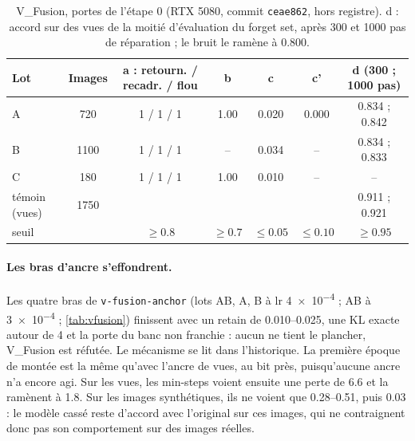 \documentclass[11pt,a4paper]{article}
\newcommand{\code}[1]{\texttt{#1}}
\begin{document}
\begin{table}[ht]
  \centering\small
  \caption{V\_Fusion, portes de l'étape 0 (RTX 5080, commit \code{ceae862}, hors registre). d :
  accord sur des vues de la moitié d'évaluation du forget set, après 300 et 1000 pas de réparation ; le
  bruit le ramène à \num{0.800}.}\label{tab:vfusionportes}
  \setlength{\tabcolsep}{4pt}
  \begin{tabular}{@{}lcccccc@{}}
    \toprule
    Lot & Images & a : retourn. / recadr. / flou & b & c & c' & d (300 ; 1000 pas)\\
    \midrule
    A & 720 & 1 / 1 / 1 & \num{1.00} & \num{0.020} & \num{0.000} & \num{0.834} ; \num{0.842}\\
    B & 1100 & 1 / 1 / 1 & -- & \num{0.034} & -- & \num{0.834} ; \num{0.833}\\
    C & 180 & 1 / 1 / 1 & \num{1.00} & \num{0.010} & -- & --\\
    témoin (vues) & 1750 & & & & & \num{0.911} ; \num{0.921}\\
    seuil & & ${}\ge\num{0.8}$ & ${}\ge\num{0.7}$ & ${}\le\num{0.05}$ & ${}\le\num{0.10}$ & ${}\ge\num{0.95}$\\
    \bottomrule
  \end{tabular}
\end{table}

\paragraph{Les bras d'ancre s'effondrent.} Les quatre bras de \code{v-fusion-anchor} (lots AB, A, B à
lr \num{4e-4} ; AB à \num{3e-4} ; \cref{tab:vfusion}) finissent avec un retain de
\numrange{0.010}{0.025}, une KL exacte autour de 4 et la porte du banc non franchie : aucun ne tient
le plancher, V\_Fusion est réfutée. Le mécanisme se lit dans l'historique. La première époque de
montée est la même qu'avec l'ancre de vues, au bit près, puisqu'aucune ancre n'a encore agi. Sur les
vues, les min-steps voient ensuite une perte de \num{6.6} et la ramènent à \num{1.8}. Sur les images
synthétiques, ils ne voient que \numrange{0.28}{0.51}, puis \num{0.03} : le modèle cassé reste d'accord
avec l'original sur ces images, qui ne contraignent donc pas son comportement sur des images réelles.
\end{document}

